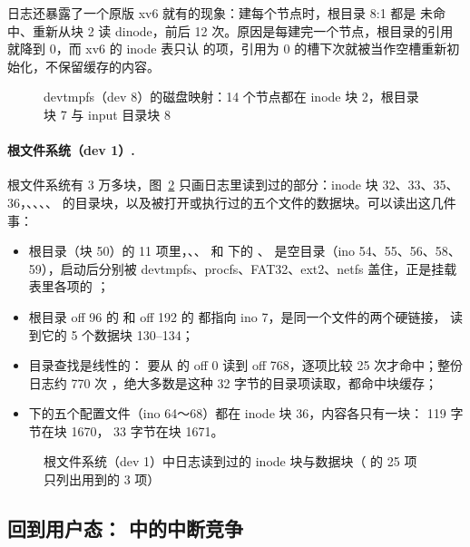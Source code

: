 日志还暴露了一个原版 xv6 就有的现象：建每个节点时，根目录 8:1 都是  未命中、重新从块 2 读 dinode，前后 12 次。原因是每建完一个节点，根目录的引用就降到 0，而 xv6 的 inode 表只认  的项，引用为 0 的槽下次就被当作空槽重新初始化，不保留缓存的内容。

\begin{figure}[htbp]
  \centering
  
  \caption{devtmpfs（dev 8）的磁盘映射：14 个节点都在 inode 块 2，根目录块 7 与 input 目录块 8}
  \label{fig:fstrace-dev8}
\end{figure}

\paragraph{根文件系统（dev 1）.} 根文件系统有 3 万多块，图~\ref{fig:fstrace-dev1} 只画日志里读到过的部分：inode 块 32、33、35、36，\code{/}、、、、 的目录块，以及被打开或执行过的五个文件的数据块。可以读出这几件事：

\begin{itemize}
  \item 根目录（块 50）的 11 项里，、、 和  下的 、 是空目录（ino 54、55、56、58、59），启动后分别被 devtmpfs、procfs、FAT32、ext2、netfs 盖住，正是挂载表里各项的 ；
  \item 根目录 off 96 的  和  off 192 的  都指向 ino 7，是同一个文件的两个硬链接， 读到它的 5 个数据块 130--134；
  \item 目录查找是线性的： 要从  的 off 0 读到 off 768，逐项比较 25 次才命中；整份日志约 770 次 ，绝大多数是这种 32 字节的目录项读取，都命中块缓存；
  \item {} 下的五个配置文件（ino 64～68）都在 inode 块 36，内容各只有一块： 119 字节在块 1670， 33 字节在块 1671。
\end{itemize}

\begin{figure}[p]
  \centering
  
  \caption{根文件系统（dev 1）中日志读到过的 inode 块与数据块（ 的 25 项只列出用到的 3 项）}
  \label{fig:fstrace-dev1}
\end{figure}

\subsection{回到用户态： 中的中断竞争}

